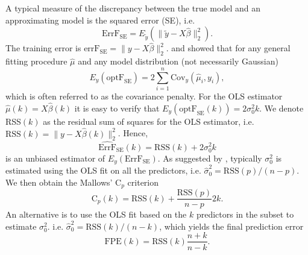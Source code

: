 A typical measure of the discrepancy between the true model and an approximating model is the squared error (SE), i.e. 
\begin{equation*}
\text{ErrF}_\text{SE} = E_{\tilde{y}}\left( \lVert \tilde{y}-X\hat{\beta} \rVert_2^2 \right).
\end{equation*} 
The training error is $\text{errF}_\text{SE} = \displaystyle \lVert y-X\hat{\beta} \rVert_2^2$. \citet{ye1998measuring} and \citet{efron2004estimation} showed that for any general fitting procedure $\hat\mu$ and any model distribution (not necessarily Gaussian)
\begin{equation}
E_y(\text{optF}_\text{SE}) = 2\sum_{i=1}^n \text{Cov}_y(\hat\mu_i,y_i),
\label{eq:EoptF_SE}
\end{equation}
which is often referred to as the covariance penalty. For the OLS estimator $\hat\mu(k) = X\hat\beta(k)$ it is easy to verify that $E_y(\text{optF}_\text{SE}(k)) = 2 \sigma_0^2 k$. We denote RSS$(k)$ as the residual sum of squares for the OLS estimator, i.e. $\text{RSS}(k)=\lVert y- X\hat\beta(k) \rVert_2^2$. Hence,
\begin{equation*}
\widehat{\text{ErrF}}_\text{SE}(k) = \text{RSS}(k) + 2 \sigma_0^2 k
\end{equation*}
is an unbiased estimator of $E_y(\text{ErrF}_\text{SE})$. As suggested by \citet{mallows1973some}, typically $\sigma_0^2$ is estimated using the OLS fit on all the predictors, i.e. $\hat\sigma_0^2=\text{RSS}(p)/(n-p)$. We then obtain the Mallows' C$_p$ criterion \citep{mallows1973some} 
\begin{equation}
\text{C}_p(k) = \text{RSS}(k) + \frac{\text{RSS}(p)}{n-p} 2k.
\label{eq:cp_subsetselection}
\end{equation}
An alternative is to use the OLS fit based on the $k$ predictors in the subset to estimate $\sigma_0^2$. i.e. $\hat\sigma_0^2 = \text{RSS}(k)/(n-k)$, which yields the final prediction error \citep{akaike1969fitting,akaike1970statistical}
\begin{equation}
\text{FPE}(k) = \text{RSS}(k)\frac{n+k}{n-k}.
\label{eq:cptilde_subsetselection}
\end{equation}



